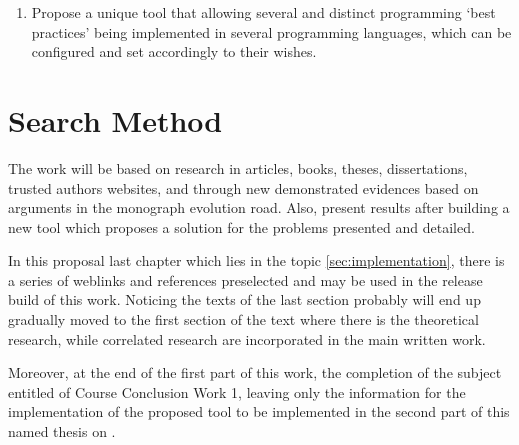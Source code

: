 \begin{englishtext}
\begin{enumerate}
        \item Propose a unique tool that allowing several and distinct
        programming `best practices' being implemented in several programming
        languages, which can be configured and set accordingly to their wishes.
    \end{enumerate}



    \section{Search Method}

    The work will be based on research in articles, books, theses,
    dissertations, trusted authors websites, and through new demonstrated
    evidences based on arguments in the monograph evolution road. Also, present
    results after building a new tool which proposes a solution for the problems
    presented and detailed. \cite{aspectOriented}

    In this proposal last chapter which lies in the topic
    \autoref{sec:implementation}, there is a series of weblinks and references
    preselected and may be used in the release build of this work. Noticing the
    texts of the last section probably will end up gradually moved to the first
    section of the text where there is the theoretical research, while
    correlated research are incorporated in the main written work.
    \cite{aspectOrientationReview}

    Moreover, at the end of the first part of this work, the completion of the
    subject entitled of Course Conclusion Work 1, leaving only the information
    for the implementation of the proposed tool to be implemented in the second
    part of this named thesis on .

\end{englishtext}




